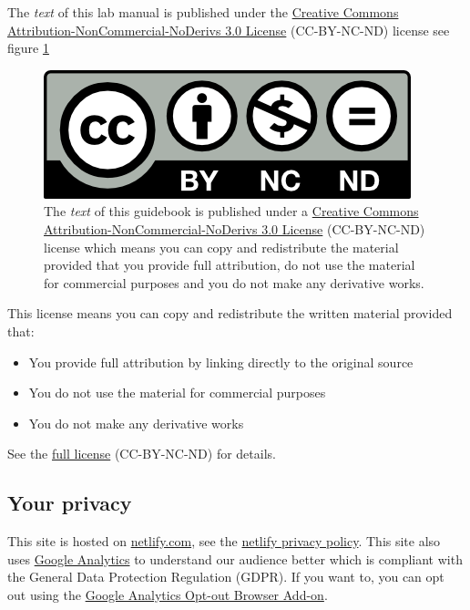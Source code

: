 \documentclass[
]{book}
\providecommand{\tightlist}{%
  \setlength{\itemsep}{0pt}\setlength{\parskip}{0pt}}
\begin{document}
The \emph{text} of this lab manual is published under the \href{https://creativecommons.org/licenses/by-nc-nd/3.0/}{Creative Commons Attribution-NonCommercial-NoDerivs 3.0 License} (CC-BY-NC-ND) license see figure \ref{fig:cc-by-nc-nd-fig}

\begin{figure}

{\centering \includegraphics[width=1\linewidth]{images/by-nc-nd} 

}

\caption{The \emph{text} of this guidebook is published under a \href{https://creativecommons.org/licenses/by-nc-nd/3.0/}{Creative Commons Attribution-NonCommercial-NoDerivs 3.0 License} (CC-BY-NC-ND) license which means you can copy and redistribute the material provided that you provide full attribution, do not use the material for commercial purposes and you do not make any derivative works.}\label{fig:cc-by-nc-nd-fig}
\end{figure}



This license means you can copy and redistribute the written material provided that:

\begin{itemize}
\tightlist
\item
  You provide full attribution by linking directly to the original source
\item
  You do not use the material for commercial purposes
\item
  You do not make any derivative works
\end{itemize}

See the \href{https://creativecommons.org/licenses/by-nc-nd/3.0/}{full license} (CC-BY-NC-ND) for details.

\hypertarget{privacy}{%
\subsection{Your privacy}\label{privacy}}

This site is hosted on \href{https://www.netlify.com/}{netlify.com}, see the \href{https://www.netlify.com/privacy/}{netlify privacy policy}. This site also uses \href{https://en.wikipedia.org/wiki/Google_Analytics}{Google Analytics} to understand our audience better which is compliant with the General Data Protection Regulation (GDPR). If you want to, you can opt out using the \href{https://tools.google.com/dlpage/gaoptout/}{Google Analytics Opt-out Browser Add-on}.
\end{document}
